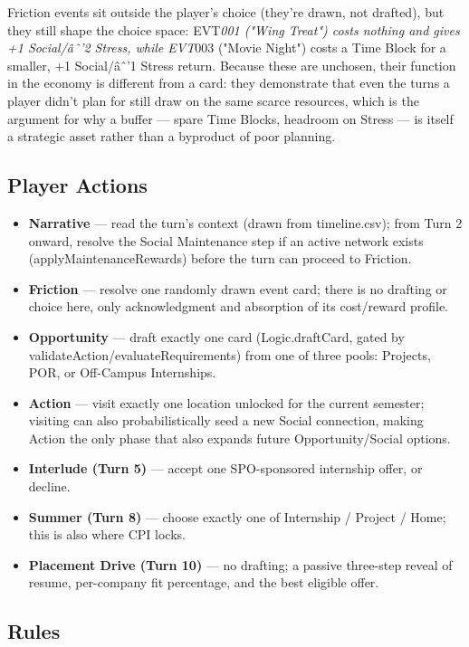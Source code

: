 Friction events sit outside the player's choice (they're drawn, not drafted), but they still shape the choice space: EVT\emph{001 ("Wing Treat") costs nothing and gives +1 Social/âˆ'2 Stress, while EVT}003 ("Movie Night") costs a Time Block for a smaller, +1 Social/âˆ'1 Stress return. Because these are unchosen, their function in the economy is different from a card: they demonstrate that even the turns a player didn't plan for still draw on the same scarce resources, which is the argument for why a buffer --- spare Time Blocks, headroom on Stress --- is itself a strategic asset rather than a byproduct of poor planning.

\subsection{Player Actions}

\begin{itemize}\item \textbf{Narrative} --- read the turn's context (drawn from timeline.csv); from Turn 2 onward, resolve the Social Maintenance step if an active network exists (applyMaintenanceRewards) before the turn can proceed to Friction.\item \textbf{Friction} --- resolve one randomly drawn event card; there is no drafting or choice here, only acknowledgment and absorption of its cost/reward profile.\item \textbf{Opportunity} --- draft exactly one card (Logic.draftCard, gated by validateAction/evaluateRequirements) from one of three pools: Projects, POR, or Off-Campus Internships.\item \textbf{Action} --- visit exactly one location unlocked for the current semester; visiting can also probabilistically seed a new Social connection, making Action the only phase that also expands future Opportunity/Social options.\item \textbf{Interlude (Turn 5)} --- accept one SPO-sponsored internship offer, or decline.\item \textbf{Summer (Turn 8)} --- choose exactly one of Internship / Project / Home; this is also where CPI locks.\item \textbf{Placement Drive (Turn 10)} --- no drafting; a passive three-step reveal of resume, per-company fit percentage, and the best eligible offer.\end{itemize}

\subsection{Rules}


